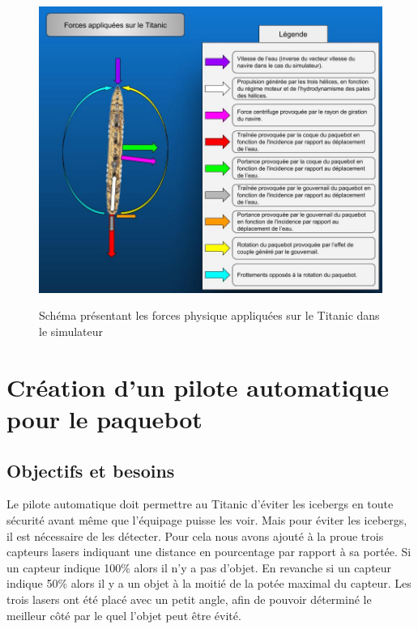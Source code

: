 \documentclass[a4paper,11pt]{article}
\begin{document}
    \begin{figure}[h!]
        \begin{center}
            \caption{Schéma présentant les forces physique appliquées sur le Titanic dans le simulateur}
            \includegraphics[scale=0.5]{assets/Isaac_vs_Titanic.jpg}
            \label{fig:titanicForces}
        \end{center}
    \end{figure}

    \section{Création d'un pilote automatique pour le paquebot}

    \subsection{Objectifs et besoins}

    Le pilote automatique doit permettre au Titanic d’éviter les icebergs en toute sécurité avant même que l'équipage puisse les voir.
    Mais pour éviter les icebergs, il est nécessaire de les détecter. Pour cela nous avons ajouté à la proue trois capteurs lasers indiquant une distance en pourcentage par rapport à sa portée.
    Si un capteur indique 100\% alors il n'y a pas d'objet. En revanche si un capteur indique 50\% alors il y a un objet à la moitié de la potée maximal du capteur. Les trois lasers ont été placé avec un petit angle, afin de pouvoir déterminé le meilleur côté par le quel l'objet peut être évité.
\end{document}
